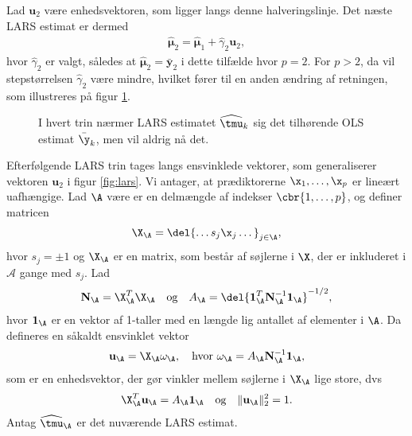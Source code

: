 %
Lad $\mathbf{u}_2$ være enhedsvektoren, som ligger langs denne halveringslinje.
Det næste LARS estimat er dermed
\begin{align*}
\widehat{\boldsymbol{\mu}}_2 = \widehat{\boldsymbol{\mu}}_1+ \widehat{\gamma}_2 \mathbf{u}_2,
\end{align*}
hvor $\widehat{\gamma}_2$ er valgt, således at $\widehat{\boldsymbol{\mu}}_2 = \bar{\textbf{y}}_2$ i dette tilfælde hvor $p = 2$. 
For \(p>2\), da vil stepstørrelsen \(\widehat{\gamma}_2\) være mindre, hvilket fører til en anden ændring af retningen, som illustreres på figur \ref{fig:lars2}.
%
\begin{figure}[H]
\centering
\scalebox{0.8}{}
\caption{I hvert trin nærmer LARS estimatet \(\widehat{\tmu}_k\) sig det tilhørende OLS estimat \(\bar{\y}_k\), men vil aldrig nå det.
 }\label{fig:lars2}
\end{figure}
%
Efterfølgende LARS trin tages langs ensvinklede vektorer, som generaliserer vektoren \(\mathbf{u}_2\) i figur \ref{fig:lars}.
Vi antager, at prædiktorerne \(\x_1, \ldots, \x_p\) er lineært uafhængige.
Lad \(\A\) være er en delmængde af indekser \(\cbr{1,\ldots, p}\), og definer matricen
\begin{align}
\X_\A = \del{\dots s_j \x_j \dots}_{j \in \A}, \label{eq:lars_2.4}
\end{align}
hvor $s_j = \pm 1$ og \(\X_\A\) er en matrix, som består af søjlerne i \(\X\), der er inkluderet i \(\mathcal{A}\) gange med \(s_j\).
Lad 
\begin{align}
\mathbf{N}_\A = \X_\A^T \X_\A \quad \text{og} \quad A_\A = \del{\mathbf{1}_\A^T \mathbf{N}_\A^{-1} \mathbf{1}_\A}^{-1/2}, \label{eq:lars_2.5}
\end{align}
hvor \(\mathbf{1}_\A\) er en vektor af 1-taller med en længde lig antallet af elementer i \(\A\).
Da defineres en såkaldt ensvinklet vektor
\begin{align}
\mathbf{u}_\A = \X_\A \omega_\A, \quad \text{hvor } \omega_\A = A_\A \mathbf{N}_\A^{-1} \mathbf{1}_\A, \label{eq:lars_2.6}
\end{align}
som er en enhedsvektor, der gør vinkler mellem søjlerne i \(\X_\A\) lige store, dvs
\begin{align}
\X_\A^T \mathbf{u}_\A = A_\A \mathbf{1}_\A \quad \text{og} \quad \Vert \mathbf{u}_\A \Vert_2^2 = 1. \label{eq:lars_2.7}
\end{align}
Antag \(\widehat{\tmu}_\A\) er det nuværende LARS estimat.
